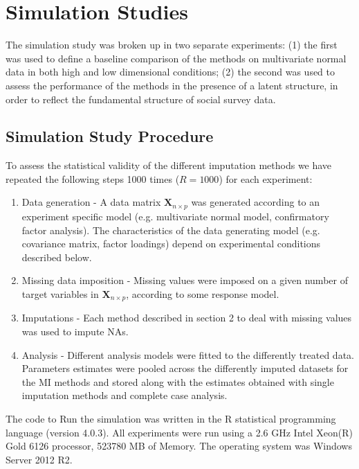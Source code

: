 \section{Simulation Studies}

The simulation study was broken up in two separate experiments: (1) the first was used to define a baseline comparison 
of the methods on multivariate normal data in both high and low dimensional conditions; (2) the second was used to 
assess the performance of the methods in the presence of a latent structure, in order to reflect the fundamental
structure of social survey data.

\subsection{Simulation Study Procedure}
	
	To assess the statistical validity of the different imputation methods we have repeated the following steps
	1000 times ($R = 1000$) for each experiment:

	\begin{enumerate}
		\item Data generation - A data matrix $\bm{X}_{n \times p}$ was generated according to an experiment 
			specific model (e.g. multivariate normal model, confirmatory factor analysis).
			The characteristics of the data generating model (e.g. covariance matrix, factor loadings) 
			depend on experimental conditions described below.
		\item Missing data imposition - Missing values were imposed on a given number of target variables
			in $\bm{X}_{n \times p}$, according to some response model.
		\item Imputations - Each method described in section 2 to deal with missing values was used to impute
			NAs.
		\item Analysis - Different analysis models were fitted to the differently treated data.
			Parameters estimates were pooled across the differently imputed datasets for the MI methods and
			stored along with the estimates obtained with single imputation methods and complete case 
			analysis.
	\end{enumerate}

	The code to Run the simulation was written in the R statistical programming language (version 4.0.3). 
	All experiments were run using a 2.6 GHz Intel Xeon(R) Gold 6126 processor, 523780 MB of Memory. The
	operating system was Windows Server 2012 R2.

